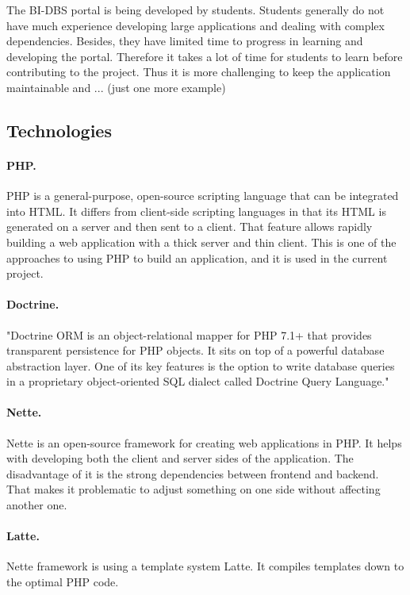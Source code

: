 \noindent The BI-DBS portal is being developed by students. Students generally do not have much experience developing large applications and dealing with complex dependencies. Besides, they have limited time to progress in learning and developing the portal. Therefore it takes a lot of time for students to learn before contributing to the project. Thus it is more challenging to keep the application maintainable and ... (just one more example)


\subsection{Technologies}
\paragraph*{PHP.} PHP is a general-purpose, open-source scripting language that can be integrated into HTML. It differs from client-side scripting languages in that its HTML is generated on a server and then sent to a client. That feature allows rapidly building a web application with a thick server and thin client. This is one of the approaches to using PHP to build an application, and it is used in the current project.

\paragraph*{Doctrine.} "Doctrine ORM is an object-relational mapper for PHP 7.1+ that provides transparent persistence for PHP objects. It sits on top of a powerful database abstraction layer. One of its key features is the option to write database queries in a proprietary object-oriented SQL dialect called Doctrine Query Language."


\paragraph*{Nette.} Nette is an open-source framework for creating web applications in PHP. It helps with developing both the client and server sides of the application. The disadvantage of it is the strong dependencies between frontend and backend. That makes it problematic to adjust something on one side without affecting another one.

\paragraph*{Latte.} Nette framework is using a template system Latte. It compiles templates down to the optimal PHP code. 

